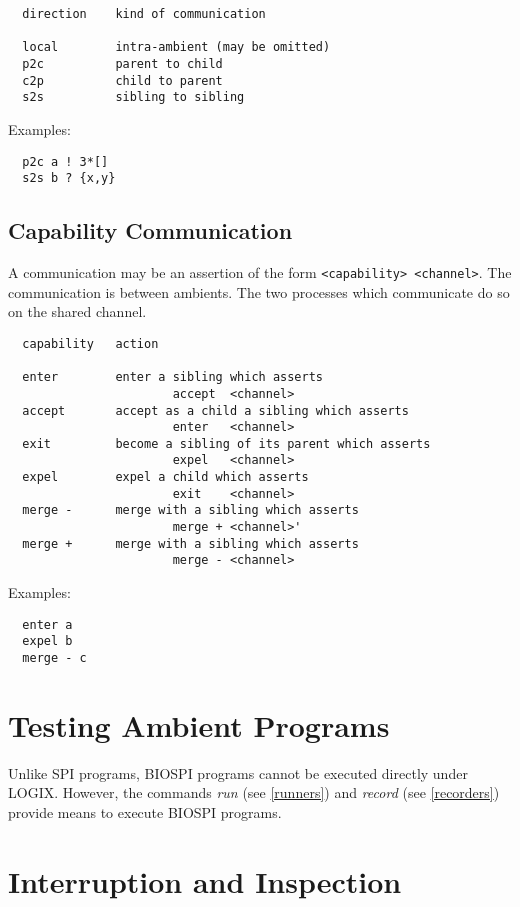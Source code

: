 \begin{verbatim}
  direction    kind of communication

  local        intra-ambient (may be omitted)
  p2c          parent to child
  c2p          child to parent
  s2s          sibling to sibling
\end{verbatim}

\noindent
Examples:

\begin{verbatim}
  p2c a ! 3*[]
  s2s b ? {x,y}
\end{verbatim}

\subsection{Capability Communication}

A communication may be an assertion of the form \verb+<capability> <channel>+.
The communication is between ambients.  The two
processes which communicate do so on the shared channel.

\newpage
\begin{verbatim}
  capability   action

  enter        enter a sibling which asserts
                       accept  <channel>
  accept       accept as a child a sibling which asserts
                       enter   <channel>
  exit         become a sibling of its parent which asserts
                       expel   <channel>
  expel        expel a child which asserts
                       exit    <channel>
  merge -      merge with a sibling which asserts
                       merge + <channel>'
  merge +      merge with a sibling which asserts
                       merge - <channel>
\end{verbatim}

\noindent
Examples:

\begin{verbatim}
  enter a
  expel b
  merge - c
\end{verbatim}

\section{Testing Ambient Programs}

Unlike SPI programs, BIOSPI programs cannot be
executed directly under LOGIX.  However, the commands {\em run} (see
\ref{runners}) and {\em record} (see \ref{recorders})
provide means to execute BIOSPI programs.

\section{Interruption and Inspection}

